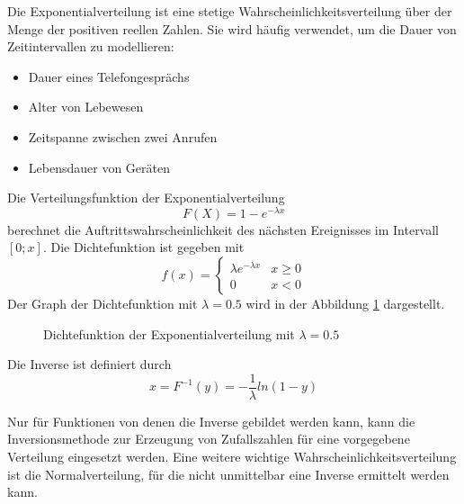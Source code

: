 Die Exponentialverteilung ist eine stetige Wahrscheinlichkeitsverteilung über der Menge der positiven reellen Zahlen. Sie wird häufig verwendet, um die Dauer von Zeitintervallen zu modellieren:
\begin{itemize}
    \item Dauer eines Telefongesprächs
    \item Alter von Lebewesen
    \item Zeitspanne zwischen zwei Anrufen
    \item Lebensdauer von Geräten
\end{itemize}
Die Verteilungsfunktion der Exponentialverteilung 
$$F(X)=1-e^{-\lambda x}$$
berechnet die Auftrittswahrscheinlichkeit des nächsten Ereignisses im Intervall $[0;x]$. Die Dichtefunktion ist gegeben mit
$$f(x)= 
    \begin{cases}\displaystyle
    \lambda e^{-\lambda x} & x\geq 0 \\
    0 & x < 0
    \end{cases}$$
Der Graph der Dichtefunktion mit $\lambda=0.5$ wird in der Abbildung \ref{fig:exponentialverteilung} dargestellt.

\begin{figure}[H]
    \centering
    \caption{Dichtefunktion der Exponentialverteilung mit $\lambda=0.5$}
    \label{fig:exponentialverteilung}
\end{figure}

Die Inverse ist definiert durch
$$x=F^{-1}(y)=-\frac{1}{\lambda}ln(1-y)$$

Nur für Funktionen von denen die Inverse gebildet werden kann, kann die Inversionsmethode zur Erzeugung von Zufallszahlen für eine vorgegebene Verteilung eingesetzt werden. Eine weitere wichtige Wahrscheinlichkeitsverteilung ist die Normalverteilung, für die nicht unmittelbar eine Inverse ermittelt werden kann. 

